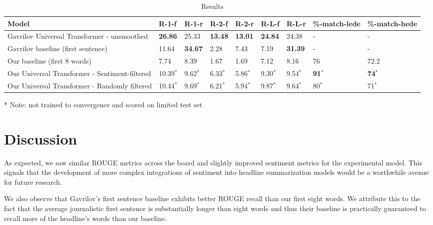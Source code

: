 \documentclass[11pt]{article}
\begin{document}
\begin{table}[h!]
\begin{threeparttable}
\centering
\begin{small}
\begin{tabular}{|p{7cm}|p{.8cm}|p{.8cm}|p{.8cm}|p{.8cm}|p{.8cm}|p{.8cm}|p{1cm}|p{1cm}|}
 \hline
 Model & R-1-f & R-1-r & R-2-f & R-2-r & R-L-f & R-L-r & \%-match-lede & \%-match-hede \\
 \hline
 Gavrilov Universal Transformer - unsmoothed & \textbf{26.86} & 25.33 & \textbf{13.48} & \textbf{13.01} & \textbf{24.84} & 24.38 & - & - \\ [0.5ex] 
 Gavrilov baseline (first sentence) & 11.64 & \textbf{34.67} & 2.28 & 7.43 & 7.19 & \textbf{31.39} & - & - \\ 
 Our baseline (first 8 words) & 7.74 & 8.39 & 1.67 & 1.69 & 7.12 & 8.16 & 76 & 72.2\\
 Our Universal Transformer - Sentiment-filtered & 10.39$^{*}$ & 9.62$^{*}$ & 6.33$^{*}$ & 5.86$^{*}$ & 9.30$^{*}$ & 9.54$^{*}$ & \textbf{91}$^{*}$ & \textbf{74}$^{*}$ \\
 Our Universal Transformer - Randomly filtered & 10.44$^{*}$ & 9.69$^{*}$ & 6.21$^{*}$ & 5.94$^{*}$ & 9.87$^{*}$ & 9.64$^{*}$ & 80$^{*}$ & 71$^{*}$ \\ [1ex]
 \hline
\end{tabular}
\end{small}
\begin{tablenotes}\footnotesize
\item[*] Note: not trained to convergence and scored on limited test set
\end{tablenotes}
\caption{Results}
\end{threeparttable}
\label{table:results}
\end{table}

\section{Discussion}

As expected, we saw similar ROUGE metrics across the board and slightly improved sentiment metrics for the experimental model. This signals that the development of more complex integrations of sentiment into headline summarization models would be a worthwhile avenue for future research.

We also observe that Gavrilov's first sentence baseline exhibits better ROUGE recall than our first eight words. We attribute this to the fact that the average journalistic first sentence is substantially longer than eight words and thus their baseline is practically guaranteed to recall more of the headline's words than our baseline.
\end{document}
